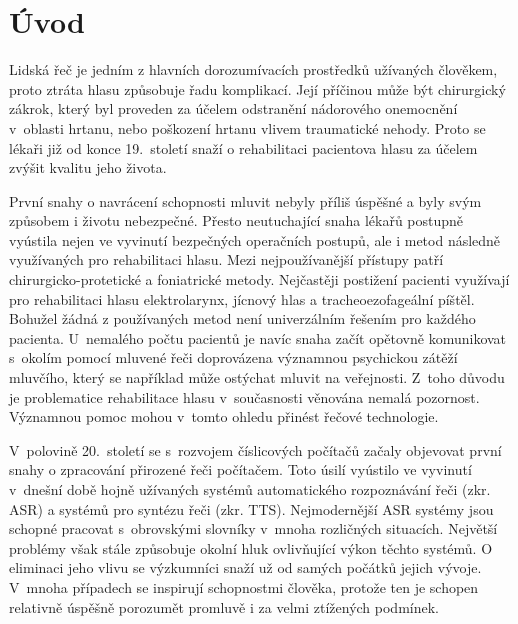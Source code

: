 \chapter*{Úvod}
\label{chap:introduction}

Lidská řeč je jedním z hlavních dorozumívacích prostředků užívaných člověkem, proto
ztráta hlasu způsobuje řadu komplikací. Její příčinou může být chirurgický zákrok, který byl proveden za účelem odstranění nádorového onemocnění v~oblasti hrtanu, nebo
poškození hrtanu vlivem traumatické nehody. Proto se lékaři již od konce 19.~století snaží o rehabilitaci pacientova hlasu za účelem zvýšit kvalitu jeho života.

První snahy o navrácení schopnosti mluvit nebyly příliš úspěšné a byly svým
způsobem i životu nebezpečné. Přesto neutuchající snaha lékařů postupně
vyústila nejen ve vyvinutí bezpečných operačních postupů, ale i metod následně využívaných pro rehabilitaci hlasu. Mezi nejpoužívanější přístupy patří chirurgicko-protetické a foniatrické metody.
Nejčastěji postižení pacienti využívají pro rehabilitaci hlasu elektrolarynx, jícnový hlas a tracheoezofageální píštěl. Bohužel žádná z používaných metod není univerzálním řešením pro každého pacienta.
U~nemalého počtu pacientů je navíc snaha začít opětovně komunikovat s~okolím pomocí mluvené řeči doprovázena významnou psychickou zátěží mluvčího, který se například může ostýchat mluvit na veřejnosti.
Z~toho důvodu je problematice rehabilitace hlasu v~současnosti věnována nemalá pozornost. Významnou pomoc mohou v~tomto ohledu přinést řečové technologie.

V~polovině 20.~století se s~rozvojem číslicových počítačů začaly objevovat první
snahy o zpracování přirozené řeči počítačem. Toto úsilí vyústilo ve vyvinutí v~dnešní
době hojně užívaných systémů automatického rozpoznávání řeči (zkr. ASR) a systémů pro syntézu
řeči (zkr. TTS). Nejmodernější ASR systémy jsou schopné pracovat s~obrovskými
slovníky v~mnoha rozličných situacích. Největší problémy však stále způsobuje
okolní hluk ovlivňující výkon těchto systémů. O eliminaci jeho vlivu se
výzkumníci snaží už od samých počátků jejich vývoje. V~mnoha případech se
inspirují schopnostmi člověka, protože ten je schopen relativně úspěšně
porozumět promluvě i za velmi ztížených podmínek.

